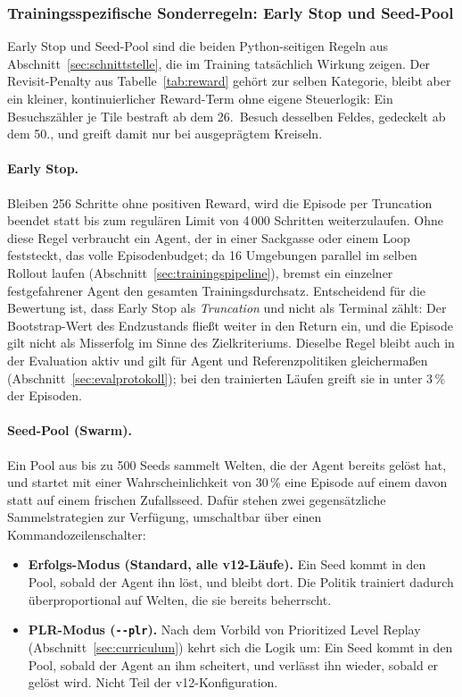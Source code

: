 \documentclass[11pt,a4paper]{article}
\begin{document}
\subsubsection{Trainingsspezifische Sonderregeln: Early Stop und Seed-Pool}
\label{sec:sonderregeln}

Early Stop und Seed-Pool sind die beiden Python-seitigen Regeln aus
Abschnitt~\ref{sec:schnittstelle}, die im Training tatsächlich Wirkung
zeigen. Der Revisit-Penalty aus Tabelle~\ref{tab:reward} gehört zur selben
Kategorie, bleibt aber ein kleiner, kontinuierlicher Reward-Term ohne eigene
Steuerlogik: Ein Besuchszähler je Tile bestraft ab dem 26.\ Besuch desselben
Feldes, gedeckelt ab dem 50., und greift damit nur bei ausgeprägtem Kreiseln.

\paragraph{Early Stop.} Bleiben 256 Schritte ohne positiven Reward, wird die
Episode per Truncation beendet statt bis zum regulären Limit von 4\,000
Schritten weiterzulaufen. Ohne diese Regel verbraucht ein Agent, der in einer
Sackgasse oder einem Loop feststeckt, das volle Episodenbudget; da 16
Umgebungen parallel im selben Rollout laufen
(Abschnitt~\ref{sec:trainingspipeline}), bremst ein einzelner festgefahrener
Agent den gesamten Trainingsdurchsatz. Entscheidend für die Bewertung ist,
dass Early Stop als \emph{Truncation} und nicht als Terminal zählt: Der
Bootstrap-Wert des Endzustands fließt weiter in den Return ein, und die
Episode gilt nicht als Misserfolg im Sinne des Zielkriteriums. Dieselbe Regel
bleibt auch in der Evaluation aktiv und gilt für Agent und Referenzpolitiken
gleichermaßen (Abschnitt~\ref{sec:evalprotokoll}); bei den trainierten Läufen
greift sie in unter 3\,\% der Episoden.

\paragraph{Seed-Pool (\glqq Swarm\grqq).} Ein Pool aus bis zu 500 Seeds
sammelt Welten, die der Agent bereits gelöst hat, und startet mit einer
Wahrscheinlichkeit von 30\,\% eine Episode auf einem davon statt auf einem
frischen Zufallsseed. Dafür stehen zwei gegensätzliche Sammelstrategien zur
Verfügung, umschaltbar über einen Kommandozeilenschalter:

\begin{itemize}
  \item \textbf{Erfolgs-Modus (Standard, alle v12-Läufe).} Ein Seed kommt in
    den Pool, sobald der Agent ihn löst, und bleibt dort. Die Politik
    trainiert dadurch überproportional auf Welten, die sie bereits
    beherrscht.
  \item \textbf{PLR-Modus (\texttt{-{}-plr}).} Nach dem Vorbild von Prioritized
    Level Replay (Abschnitt~\ref{sec:curriculum}) kehrt sich die Logik um:
    Ein Seed kommt in den Pool, sobald der Agent an ihm scheitert, und
    verlässt ihn wieder, sobald er gelöst wird. Nicht Teil der
    v12-Konfiguration.
\end{itemize}
\end{document}
